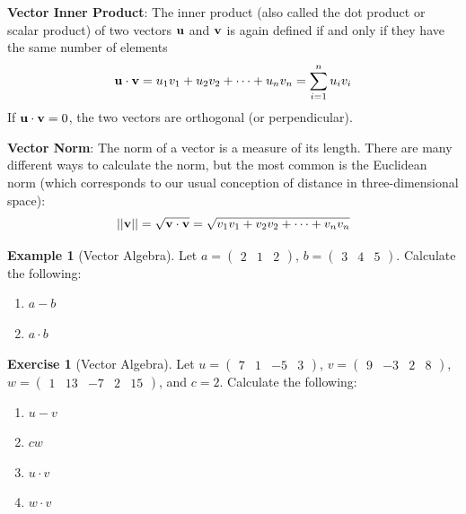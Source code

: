 \documentclass[
]{book}
\theoremstyle{definition}
\theoremstyle{definition}
\newtheorem{example}{Example}[chapter]
\theoremstyle{definition}
\newtheorem{exercise}{Exercise}[chapter]
\theoremstyle{remark}
\begin{document}
\textbf{Vector Inner Product}: The inner product (also called the dot product or scalar product) of two vectors \({\bf u}\) and \({\bf v}\) is again defined if and only if they have the same number of elements
\[ {\bf u} \cdot {\bf v} = u_1v_1 + u_2v_2 + \cdots + u_nv_n = \sum_{i = 1}^n u_iv_i\]
If \({\bf u} \cdot {\bf v} = 0\), the two vectors are orthogonal (or perpendicular).

\textbf{Vector Norm}: The norm of a vector is a measure of its length. There are many different ways to calculate the norm, but the most common is the Euclidean norm (which corresponds to our usual conception of distance in three-dimensional space):
\[ ||{\bf v}|| = \sqrt{{\bf v}\cdot{\bf v}} = \sqrt{ v_1v_1 + v_2v_2 + \cdots + v_nv_n}\]

\begin{example}[Vector Algebra]
\protect\hypertarget{exm:vectors}{}{\label{exm:vectors} {} }
Let \(a = \begin{pmatrix} 2&1&2\end{pmatrix}\), \(b = \begin{pmatrix} 3&4&5 \end{pmatrix}\). Calculate the following:

\begin{enumerate}
\def\labelenumi{\arabic{enumi}.}
\item
  \(a - b\)
\item
  \(a \cdot b\)
\end{enumerate}
\end{example}

\begin{exercise}[Vector Algebra]
\protect\hypertarget{exr:vectors1}{}{\label{exr:vectors1} {} }
Let \(u = \begin{pmatrix} 7&1&-5&3\end{pmatrix}\), \(v = \begin{pmatrix} 9&-3&2&8 \end{pmatrix}\), \(w = \begin{pmatrix} 1&13& -7&2 &15 \end{pmatrix}\), and \(c = 2\). Calculate the following:

\begin{enumerate}
\def\labelenumi{\arabic{enumi}.}
\item
  \(u-v\)
\item
  \(cw\)
\item
  \(u \cdot v\)
\item
  \(w \cdot v\)
\end{enumerate}
\end{exercise}
\end{document}
